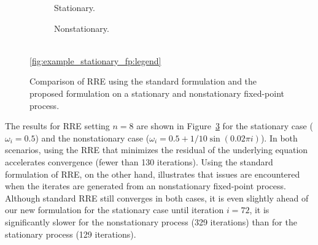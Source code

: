 \begin{figure}
	\centering
	\begin{subfigure}[b]{0.5\textwidth}
		\caption{Stationary.}%
        \label{fig:example_stationary_fp}
	\end{subfigure}%
	\begin{subfigure}[b]{0.5\textwidth}
		\centering
		\caption{Nonstationary.}%
        \label{fig:example_nonstationary_fp}
	\end{subfigure}%
	\\
	\medskip
	\ref*{fig:example_stationary_fp:legend}%
	\caption{Comparison of \ac{RRE} using the standard formulation and the proposed
      formulation on a stationary and nonstationary fixed-point process.}%
    \label{fig:example_stationary_vs_nonstationary_fp}
\end{figure}

The results for \ac{RRE} setting $n = 8$ are shown in Figure~\ref{fig:example_stationary_vs_nonstationary_fp} for
the stationary case ($\omega_i = 0.5$) and
the nonstationary case ($\omega_i = 0.5 + 1/10 \sin(0.02 \pi i)$).
In both scenarios,
using the \ac{RRE} that minimizes the residual of the underlying equation
accelerates convergence (fewer than 130 iterations). %
Using the standard formulation of \ac{RRE}, on the other hand,
illustrates that issues are encountered when the iterates are generated from an nonstationary fixed-point process.
Although standard \ac{RRE} still converges in both cases,
it is even slightly ahead of our new formulation for the stationary case until iteration $i=72$,
it is significantly slower for the nonstationary process (329 iterations) than for the stationary process (129 iterations).

\begin{algorithm}
	\caption{%
		\ac{RRE} for non-stationary processes~\eqref{eqn:xi_fp_iteration_dependent}
	}%
	\label{alg:nonstationary_rre}
	\medskip
\end{algorithm}

